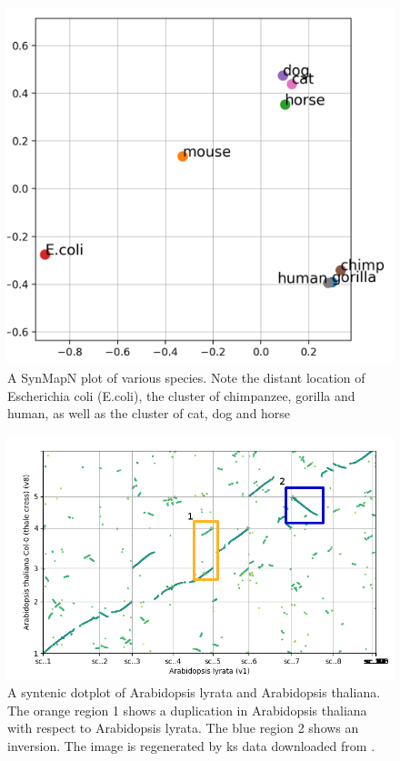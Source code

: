 \documentclass{vgtc}                      %
\begin{document}
\begin{figure}[t]
 \centering
 \includegraphics[width=0.7\columnwidth]{synmap_n}
 \caption{A SynMapN plot of various species. Note the distant location of Escherichia coli (E.coli), the cluster of chimpanzee, gorilla and human, as well as the cluster of cat, dog and horse}
 \label{fig:synmap_n}
\end{figure}


\begin{figure}[h]
 \centering
 \includegraphics[width=0.8\columnwidth]{dotplot_arabidopsis_marked}
 \caption{A syntenic dotplot of Arabidopsis lyrata and Arabidopsis thaliana. The orange region 1 shows a duplication in Arabidopsis thaliana with respect to Arabidopsis lyrata. The blue region 2 shows an inversion. The image is regenerated by ks data downloaded from \cite{arabidopsisurl}.}
 \label{fig:dotplot_arabidopsis_marked}
\end{figure}


\end{document}
